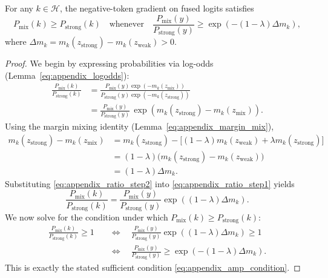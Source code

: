 \begin{corollary}
For any $k \in \mathcal{H}$, the negative-token gradient on fused logits satisfies
\begin{equation}
    P_{\mathrm{mix}}(k)
    \ge P_{\mathrm{strong}}(k)
    \quad \text{whenever} \quad
    \frac{P_{\mathrm{mix}}(y)}{P_{\mathrm{strong}}(y)}
    \ge \exp\!\left(-(1-\lambda)\Delta m_k\right),
    \label{eq:appendix_amp_condition}
\end{equation}
where $\Delta m_k = m_k(z_{\mathrm{strong}}) - m_k(z_{\mathrm{weak}}) > 0$.
\end{corollary}
\begin{proof}
We begin by expressing probabilities via log-odds (Lemma~\eqref{eq:appendix_logodds}):
\begin{align}
    \frac{P_{\mathrm{mix}}(k)}{P_{\mathrm{strong}}(k)}
    &= \frac{P_{\mathrm{mix}}(y) \exp(-m_k(z_{\text{mix}}))}{P_{\mathrm{strong}}(y) \exp(-m_k(z_{\mathrm{strong}}))} \nonumber\\
    &= \frac{P_{\mathrm{mix}}(y)}{P_{\mathrm{strong}}(y)}\,
       \exp\!\left(m_k(z_{\mathrm{strong}}) - m_k(z_{\text{mix}})\right).
    \label{eq:appendix_ratio_step1}
\end{align}
Using the margin mixing identity (Lemma~\eqref{eq:appendix_margin_mix}),
\begin{align}
    m_k(z_{\mathrm{strong}}) - m_k(z_{\text{mix}})
    &= m_k(z_{\mathrm{strong}}) - \big[(1-\lambda)m_k(z_{\mathrm{weak}}) + \lambda m_k(z_{\mathrm{strong}})\big] \nonumber\\
    &= (1-\lambda)\big(m_k(z_{\mathrm{strong}}) - m_k(z_{\mathrm{weak}})\big) \nonumber\\
    &= (1-\lambda)\Delta m_k.
    \label{eq:appendix_ratio_step2}
\end{align}
Substituting \eqref{eq:appendix_ratio_step2} into \eqref{eq:appendix_ratio_step1} yields
\begin{equation}
    \frac{P_{\mathrm{mix}}(k)}{P_{\mathrm{strong}}(k)}
    =
    \frac{P_{\mathrm{mix}}(y)}{P_{\mathrm{strong}}(y)}
    \exp\!\left((1-\lambda)\Delta m_k\right).
    \label{eq:appendix_ratio_expand}
\end{equation}
We now solve for the condition under which $P_{\mathrm{mix}}(k) \ge P_{\mathrm{strong}}(k)$:
\begin{align}
    \frac{P_{\mathrm{mix}}(k)}{P_{\mathrm{strong}}(k)} \ge 1
    &\quad \Longleftrightarrow \quad
    \frac{P_{\mathrm{mix}}(y)}{P_{\mathrm{strong}}(y)}
    \exp\!\left((1-\lambda)\Delta m_k\right)
    \ge 1 \nonumber\\
    &\quad \Longleftrightarrow \quad
    \frac{P_{\mathrm{mix}}(y)}{P_{\mathrm{strong}}(y)}
    \ge \exp\!\left(-(1-\lambda)\Delta m_k\right).
    \label{eq:appendix_ratio_rearrange}
\end{align}
This is exactly the stated sufficient condition \eqref{eq:appendix_amp_condition}.
\end{proof}

